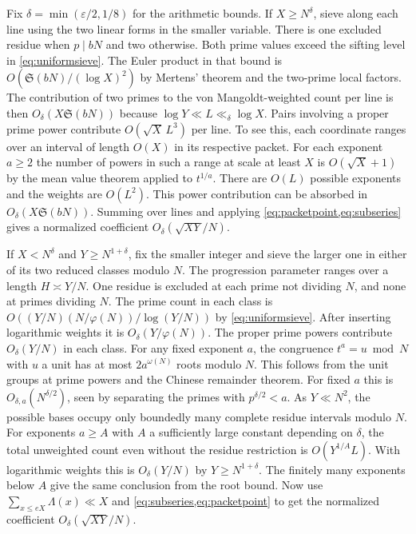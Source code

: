 \documentclass[11pt,a4paper]{article}
\numberwithin{equation}{section}
\newcommand{\SSS}{\mathfrak S}
\begin{document}
Fix $\delta=\min(\varepsilon/2,1/8)$ for the arithmetic bounds.
If $X\ge N^\delta$, sieve along each line using the two linear
forms in the smaller variable. There is one excluded residue
when $p\mid bN$ and two otherwise. Both prime values exceed
the sifting level in \cref{eq:uniformsieve}. The Euler product
in that bound is $O(\SSS(bN)/(\log X)^2)$ by Mertens' theorem
and the two-prime local factors. The contribution of two primes
to the von Mangoldt-weighted count per line is then
$O_\delta(X\SSS(bN))$ because $\log Y\ll L\ll_\delta\log X$.
Pairs involving a proper prime power contribute
$O(\sqrt X\,L^3)$ per line. To see this, each coordinate ranges
over an interval of length $O(X)$ in its respective packet.
For each exponent $a\ge2$ the number of powers in such a range
at scale at least $X$ is $O(\sqrt X+1)$ by the mean value theorem
applied to $t^{1/a}$. There are $O(L)$ possible exponents and the
weights are $O(L^2)$. This power contribution can be absorbed
in $O_\delta(X\SSS(bN))$. Summing over lines and applying
\cref{eq:packetpoint,eq:subseries} gives a normalized coefficient
$O_\delta(\sqrt{XY}/N)$.

If $X<N^\delta$ and $Y\ge N^{1+\delta}$, fix the smaller integer
and sieve the larger one in either of its two reduced classes
modulo $N$. The progression parameter ranges over a length
$H\asymp Y/N$. One residue is excluded at each prime not dividing
$N$, and none at primes dividing $N$. The prime count in each
class is
$O((Y/N)(N/\varphi(N))/\log(Y/N))$ by \cref{eq:uniformsieve}.
After inserting logarithmic weights it is $O_\delta(Y/\varphi(N))$.
The proper prime powers contribute $O_\delta(Y/N)$ in each class.
For any fixed exponent $a$, the congruence $t^a=u\bmod N$ with
$u$ a unit has at most $2a^{\omega(N)}$ roots modulo $N$.
This follows from the unit groups at prime powers and the Chinese
remainder theorem. For fixed $a$ this is $O_{\delta,a}(N^{\delta/2})$,
seen by separating the primes with $p^{\delta/2}<a$.
As $Y\ll N^2$, the possible bases occupy only boundedly many
complete residue intervals modulo $N$. For exponents $a\ge A$
with $A$ a sufficiently large constant depending on $\delta$,
the total unweighted count even without the residue restriction
is $O(Y^{1/A}L)$. With logarithmic weights this is $O_\delta(Y/N)$
by $Y\ge N^{1+\delta}$. The finitely many exponents below $A$
give the same conclusion from the root bound. Now use
$\sum_{x\le eX}\Lambda(x)\ll X$ and \cref{eq:subseries,eq:packetpoint}
to get the normalized coefficient $O_\delta(\sqrt{XY}/N)$.
\end{document}

